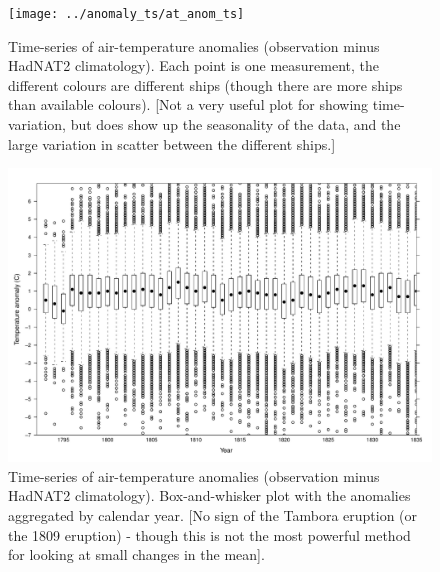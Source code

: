 \documentclass[a4paper,11pt]{article}
\begin{document}
\begin{figure}
\begin{center}
\texttt{[image: ../anomaly\_ts/at\_anom\_ts]}
\caption{Time-series of air-temperature anomalies (observation minus HadNAT2 climatology). Each point is one measurement, the different colours are different ships (though there are more ships than available colours). [Not a very useful plot for showing time-variation, but does show up the seasonality of the data, and the large variation in scatter between the different ships.] }
\label{at_anom_ts}
\end{center}
\end{figure}

\begin{figure}
\begin{center}
\includegraphics[angle=0, width=1.0\textwidth]{../anomaly_ts/at_anom_bwplot}
\caption{Time-series of air-temperature anomalies (observation minus HadNAT2 climatology). Box-and-whisker plot with the anomalies aggregated by calendar year. [No sign of the Tambora eruption (or the 1809 eruption) - though this is not the most powerful method for looking at small changes in the mean].}
\label{at_anom_bwplot}
\end{center}
\end{figure}
\end{document}
